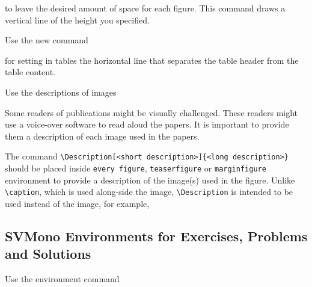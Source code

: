 \documentclass[graybox,square]{svmono}
\begin{document}
\begin{sloppy}
\cprotect{}

to leave the desired amount of space for each figure. This command draws a vertical line of the height you specified.

Use the new command
\cprotect\boxtext{\verb|\svhline|}

for setting in tables the horizontal line that separates the table header from the table content.


Use the descriptions of images

\cprotect\boxtext{\verb|\Description|}

Some readers of publications might be visually challenged. These
readers might use a voice-over software to read aloud the papers. It
is important to provide them a description of each image used in the
papers.

The command \verb|\Description[<short description>]{<long description>}| 
should be placed inside \texttt{every figure}, \texttt{teaserfigure}
or \texttt{marginfigure}
environment to provide a description of the image(s) used in the
figure. Unlike \verb|\caption|, which is used along-side the image,
\verb|\Description| is intended to be used instead of the image, for example,

\cprotect{}


\subsection{SVMono Environments for Exercises, Problems and Solutions}

Use the environment command


\end{sloppy}
\end{document}
